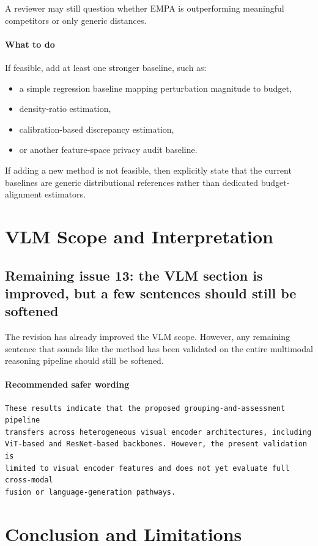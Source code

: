 \documentclass[11pt]{article}
\begin{document}
A reviewer may still question whether EMPA is outperforming meaningful competitors or only generic distances.

\paragraph{What to do}
If feasible, add at least one stronger baseline, such as:
\begin{itemize}
    \item a simple regression baseline mapping perturbation magnitude to budget,
    \item density-ratio estimation,
    \item calibration-based discrepancy estimation,
    \item or another feature-space privacy audit baseline.
\end{itemize}

If adding a new method is not feasible, then explicitly state that the current baselines are generic distributional references rather than dedicated budget-alignment estimators.

\section{VLM Scope and Interpretation}

\subsection*{Remaining issue 13: the VLM section is improved, but a few sentences should still be softened}
The revision has already improved the VLM scope. However, any remaining sentence that sounds like the method has been validated on the entire multimodal reasoning pipeline should still be softened.

\paragraph{Recommended safer wording}
\begin{verbatim}
These results indicate that the proposed grouping-and-assessment pipeline
transfers across heterogeneous visual encoder architectures, including
ViT-based and ResNet-based backbones. However, the present validation is
limited to visual encoder features and does not yet evaluate full cross-modal
fusion or language-generation pathways.
\end{verbatim}

\section{Conclusion and Limitations}
\end{document}
